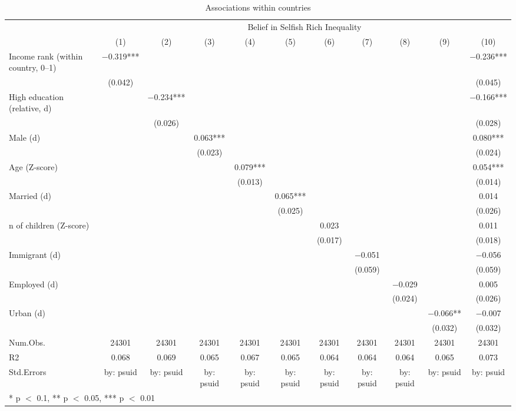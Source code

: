 \begin{table}

\caption{\label{tab:unnamed-chunk-49}Associations within countries}
\centering
\begin{tabular}[t]{lcccccccccc}
\toprule
\multicolumn{1}{c}{ } & \multicolumn{10}{c}{Belief in Selfish Rich Inequality} \\
\cmidrule(l{3pt}r{3pt}){2-11}
  & (1) & (2) & (3) & (4) & (5) & (6) & (7) & (8) & (9) & (10)\\
\midrule
Income rank (within country, 0--1) & \num{-0.319}*** &  &  &  &  &  &  &  &  & \num{-0.236}***\\
 & (\num{0.042}) &  &  &  &  &  &  &  &  & (\num{0.045})\\
High education (relative, d) &  & \num{-0.234}*** &  &  &  &  &  &  &  & \num{-0.166}***\\
 &  & (\num{0.026}) &  &  &  &  &  &  &  & (\num{0.028})\\
Male (d) &  &  & \num{0.063}*** &  &  &  &  &  &  & \num{0.080}***\\
 &  &  & (\num{0.023}) &  &  &  &  &  &  & (\num{0.024})\\
Age (Z-score) &  &  &  & \num{0.079}*** &  &  &  &  &  & \num{0.054}***\\
 &  &  &  & (\num{0.013}) &  &  &  &  &  & (\num{0.014})\\
Married (d) &  &  &  &  & \num{0.065}*** &  &  &  &  & \num{0.014}\\
 &  &  &  &  & (\num{0.025}) &  &  &  &  & (\num{0.026})\\
n of children (Z-score) &  &  &  &  &  & \num{0.023} &  &  &  & \num{0.011}\\
 &  &  &  &  &  & (\num{0.017}) &  &  &  & (\num{0.018})\\
Immigrant (d) &  &  &  &  &  &  & \num{-0.051} &  &  & \num{-0.056}\\
 &  &  &  &  &  &  & (\num{0.059}) &  &  & (\num{0.059})\\
Employed (d) &  &  &  &  &  &  &  & \num{-0.029} &  & \num{0.005}\\
 &  &  &  &  &  &  &  & (\num{0.024}) &  & (\num{0.026})\\
Urban (d) &  &  &  &  &  &  &  &  & \num{-0.066}** & \num{-0.007}\\
 &  &  &  &  &  &  &  &  & (\num{0.032}) & (\num{0.032})\\
\midrule
Num.Obs. & \num{24301} & \num{24301} & \num{24301} & \num{24301} & \num{24301} & \num{24301} & \num{24301} & \num{24301} & \num{24301} & \num{24301}\\
R2 & \num{0.068} & \num{0.069} & \num{0.065} & \num{0.067} & \num{0.065} & \num{0.064} & \num{0.064} & \num{0.064} & \num{0.065} & \num{0.073}\\
Std.Errors & by: psuid & by: psuid & by: psuid & by: psuid & by: psuid & by: psuid & by: psuid & by: psuid & by: psuid & by: psuid\\
\bottomrule
\multicolumn{11}{l}{\rule{0pt}{1em}* p $<$ 0.1, ** p $<$ 0.05, *** p $<$ 0.01}\\
\end{tabular}
\end{table}